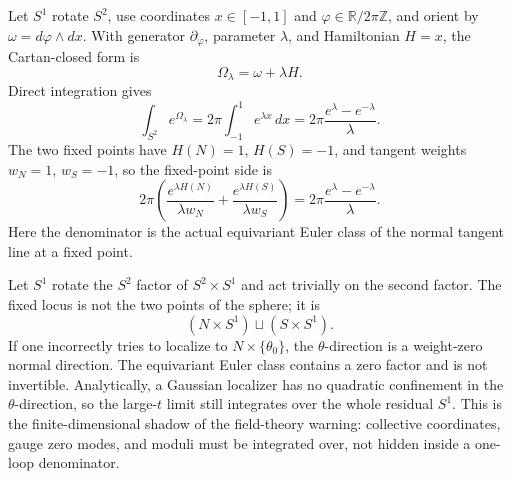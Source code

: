 \begin{example}
\label{ex:cohomological-s2-fixed-point-denominator}
Let \(S^1\) rotate \(S^2\), use coordinates \(x\in[-1,1]\) and
\(\varphi\in\mathbb R/2\pi\mathbb Z\), and orient by
\(\omega=d\varphi\wedge dx\).  With generator \(\partial_\varphi\), parameter
\(\lambda\), and Hamiltonian \(H=x\), the Cartan-closed form is
\[
  \Omega_\lambda=\omega+\lambda H .
\]
Direct integration gives
\[
  \int_{S^2}e^{\Omega_\lambda}
  =
  2\pi\int_{-1}^{1}e^{\lambda x}\,dx
  =
  2\pi\frac{e^\lambda-e^{-\lambda}}{\lambda}.
\]
The two fixed points have \(H(N)=1\), \(H(S)=-1\), and tangent weights
\(w_N=1\), \(w_S=-1\), so the fixed-point side is
\[
  2\pi
  \left(
    \frac{e^{\lambda H(N)}}{\lambda w_N}
    +
    \frac{e^{\lambda H(S)}}{\lambda w_S}
  \right)
  =
  2\pi\frac{e^\lambda-e^{-\lambda}}{\lambda}.
\]
Here the denominator is the actual equivariant Euler class of the normal
tangent line at a fixed point.
\end{example}

\begin{example}
\label{ex:cohomological-zero-weight-localization-failure}
Let \(S^1\) rotate the \(S^2\) factor of \(S^2\times S^1\) and act trivially on
the second factor.  The fixed locus is not the two points of the sphere; it is
\[
  (N\times S^1)\sqcup(S\times S^1).
\]
If one incorrectly tries to localize to \(N\times\{\theta_0\}\), the
\(\theta\)-direction is a weight-zero normal direction.  The equivariant Euler
class contains a zero factor and is not invertible.  Analytically, a Gaussian
localizer has no quadratic confinement in the \(\theta\)-direction, so the
large-\(t\) limit still integrates over the whole residual \(S^1\).  This is
the finite-dimensional shadow of the field-theory warning: collective
coordinates, gauge zero modes, and moduli must be integrated over, not hidden
inside a one-loop denominator.
\end{example}

